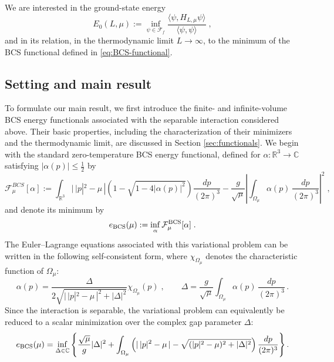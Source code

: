\documentclass[11pt]{amsart}
\theoremstyle{definition}
\numberwithin{equation}{section}
\newcommand{\R}{\mathbb R}
\newcommand{\C}{\mathbb C}
\newcommand{\1}{\mathbf 1}
\begin{document}
We are interested in the ground-state energy
\begin{equation}
    E_0(L, \mu) := \inf_{\psi \in \mathcal{F}_f}\frac{\langle \psi, H_{L, \mu} \psi \rangle}{\langle \psi, \psi \rangle}\;,
\end{equation}
and in its relation, in the thermodynamic limit \(L\to\infty\), to the minimum of the BCS functional defined in \eqref{eq:BCS-functional}.




\subsection{Setting and main result}
To formulate our main result, we first introduce the finite- and infinite-volume BCS energy functionals associated with the separable interaction considered above. Their basic properties, including the characterization of their minimizers and the thermodynamic limit, are discussed in Section \ref{sec:functionals}. We begin with the standard zero-temperature BCS energy functional, defined for $\alpha: \R^3 \to \C$ satisfying $|\alpha(p)| \leq \frac{1}{2}$ by
\begin{equation}\label{eq:BCS-functional}
    \mathcal{F}^{BCS}_{\mu}[\alpha] := \int_{\mathbb R^3}|\,|p|^2-\mu\,|
 \left(1-\sqrt{1-4|\alpha(p)|^2}\right)\frac{dp}{(2\pi)^3} - \frac{g}{\sqrt{\mu}}\left|\int_{\Omega_{\mu}}\alpha(p)\,\frac{dp}{(2\pi)^3} \right|^2\;,
\end{equation}
and denote its minimum by
\begin{equation}
    e_{\rm BCS}(\mu) := \inf_{\alpha} \mathcal{F}^{\rm BCS}_{\mu}[\alpha]\;.
\end{equation}
The Euler--Lagrange equations associated with this variational problem can be written in the following self-consistent form, where $\chi_{\Omega_{\mu}}$ denotes the characteristic function of $\Omega_{\mu}$:
\begin{equation}\label{eq:minimizers-form}
    \alpha(p) = \frac{\Delta}{2\sqrt{|\,|p|^2-\mu\,|^2 + |\Delta|^2}}\chi_{\Omega_{\mu}}(p)\;, \qquad \Delta = \frac{g}{\sqrt{\mu}}\int_{\Omega_{\mu}}\alpha(p)\,\frac{dp}{(2\pi)^3}\,.
\end{equation}
Since the interaction is separable, the variational problem can equivalently be reduced to a scalar minimization over the complex gap parameter $\Delta$:
\begin{equation}\label{eq:intro-shell-BCS}
 e_{\rm BCS}(\mu)
 =\inf_{\Delta\in\mathbb C}
 \left\{
 \frac{\sqrt\mu}{g}|\Delta|^2
 +\int_{\Omega_\mu}
 \left(|\,|p|^2-\mu\,|-\sqrt{(|p|^2-\mu)^2+|\Delta|^2}\right)
 \frac{dp}{(2\pi)^3}
 \right\}.
\end{equation}
\end{document}
